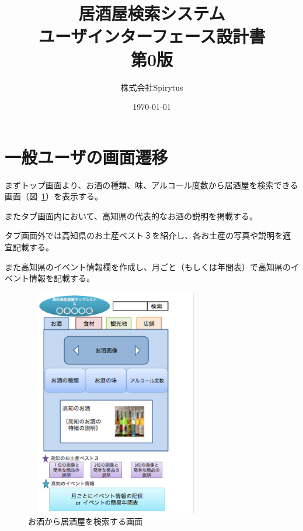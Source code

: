\documentclass[a4j,titlepage]{jarticle}
\title{居酒屋検索システム\\
ユーザインターフェース設計書\\
第0版}
\author{株式会社Spirytus}
\date{\today}
\begin{document}
\maketitle
\tableofcontents

\section{一般ユーザの画面遷移}



まずトップ画面より、お酒の種類、味、アルコール度数から居酒屋を検索できる画面（図~\ref{fig:1}）を表示する。



またタブ画面内において、高知県の代表的なお酒の説明を掲載する。



タブ画面外では高知県のお土産ベスト３を紹介し、各お土産の写真や説明を適宜記載する。



また高知県のイベント情報欄を作成し、月ごと（もしくは年間表）で高知県のイベント情報を記載する。



\begin {figure}[!htbp]
    \begin{center}
    \includegraphics [height=10cm, width=8cm]{1.eps}
    \caption {お酒から居酒屋を検索する画面}
    \label {fig:1}
    \end{center}
\end {figure}
\end{document}
